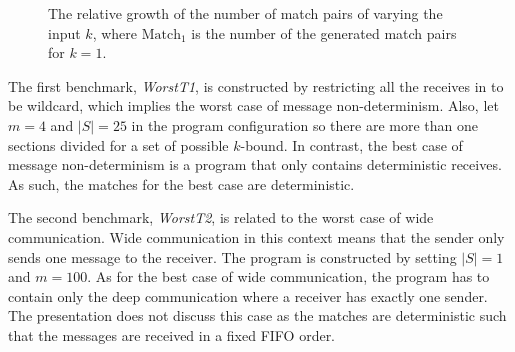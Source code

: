 \begin{figure}[!h]

\caption{The relative growth of the number of match pairs of varying the input $k$, where $\mathrm{Match}_1$ is the number of the generated match pairs for $k=1$.}
\label{fig:relation:match}
\end{figure}

The first benchmark, \textit{WorstT1}, is constructed by restricting all the receives in  to be wildcard, which implies the worst case of message non-determinism. Also, let $m=4$ and $|S| = 25$ in the program configuration so there are more than one sections divided for a set of possible $k$-bound. In contrast, the best case of message non-determinism is a program that only contains deterministic receives. As such, the matches for the best case are deterministic.

The second benchmark, \textit{WorstT2}, is related to the worst case of wide communication. Wide communication in this context means that the sender only sends one message to the receiver. The program is constructed by setting $|S|=1$ and $m=100$. As for the best case of wide communication, the program has to contain only the deep communication where a receiver has exactly one sender. The presentation does not discuss this case as the matches are deterministic such that the messages are received in a fixed FIFO order. 

